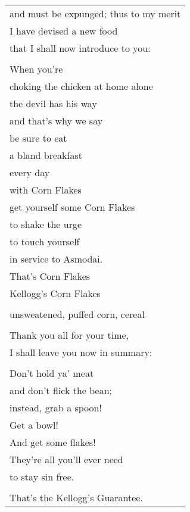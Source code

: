 \documentclass{article}
\begin{document}
\begin{center}
\begin{longtable}{l}
and must be expunged; thus to my merit \\
I have devised a new food \\
that I shall now introduce to you: \\
\\
When you're \\
choking the chicken at home alone \\
the devil has his way \\
and that's why we say \\
be sure to eat \\
a bland breakfast \\
every day \\
with Corn Flakes \\
get yourself some Corn Flakes \\
to shake the urge \\
to touch yourself \\
in service to Asmodai. \\
That's Corn Flakes \\
Kellogg's Corn Flakes \\
\\
unsweatened, puffed corn, cereal \\
\\
Thank you all for your time, \\
I shall leave you now in summary: \\
\\
Don't hold ya' meat \\
and don't flick the bean; \\
instead, grab a spoon! \\
Get a bowl! \\
And get some flakes! \\
They're all you'll ever need \\
to stay sin free. \\
\\
That's the Kellogg's Guarantee. \\
\end{longtable}
\end{center}
\end{document}
